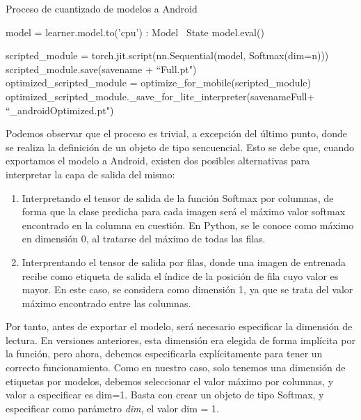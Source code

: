 \begin{algorithm}[H]
	\label{fig:cuantizado}
	\caption{Proceso de cuantizado de modelos a Android}
	\begin{algorithmic}
	
		\State model = learner.model.to('cpu') : Model
		\ State model.eval()
		
		 \State scripted\_module = torch.jit.script(nn.Sequential(model, Softmax(dim=n))) \\
	 	 \State scripted\_module.save(savename + ``Full.pt")\\  
		 \State optimized\_scripted\_module = optimize\_for\_mobile(scripted\_module) 
		 \State optimized\_scripted\_module.\_save\_for\_lite\_interpreter(savenameFull+ ``\_androidOptimized.pt")
	
		\EndProcedure
		
	\end{algorithmic}
\end{algorithm}

Podemos observar que el proceso es trivial, a excepción del último punto, donde se realiza la definición de un objeto de tipo sencuencial. Esto se debe que, cuando exportamos el modelo a Android, existen dos posibles alternativas para interpretar la capa de salida del mismo:
\begin{enumerate}
	\item Interpretando el tensor de salida de la función Softmax por columnas, de forma que la clase predicha para cada imagen será el máximo valor softmax encontrado en la columna en cuestión. En Python, se le conoce como máximo en dimensión 0, al tratarse del máximo de todas las filas.
	\item Interprentando el tensor de salida por filas, donde una imagen de entrenada recibe como etiqueta de salida el índice de la posición de fila cuyo valor es mayor. En este caso, se considera como dimensión 1, ya que se trata del valor máximo encontrado entre las columnas.
 \end{enumerate}

Por tanto, antes de exportar el modelo, será necesario especificar la dimensión de lectura. En versiones anteriores, esta dimensión era elegida de forma implícita por la función, pero ahora, debemos especificarla explícitamente para tener un correcto funcionamiento. Como en nuestro caso, solo tenemos una dimensión de etiquetas por modelos, debemos seleccionar el valor máximo por columnas, y valor a especificar es dim=1. Basta con crear un objeto de tipo Softmax, y especificar como parámetro \textit{dim}, el valor dim = 1.

